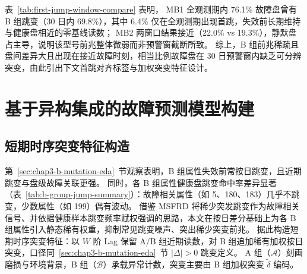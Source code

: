 表~\ref{tab:first-jump-window-compare} 表明，
MB1 全观测期内 76.1\% 故障盘曾有 B 组跳变（30 日内 69.8\%），其中 6.4\% 仅在全观测期出现首跳，失效前长期维持与健康盘相近的零基线读数；
MB2 两窗口结果接近（22.0\% vs 19.3\%），静默盘占主导，说明该型号前兆整体微弱而非预警窗截断所致。
综上，B 组前兆稀疏且盘间差异大且出现在接近故障时刻，相当比例故障盘在 30 日预警窗内缺乏可分辨突变，由此引出下文首跳对齐标签与加权突变特征设计。

\clearpage
\section{基于异构集成的故障预测模型构建}

\subsection{短期时序突变特征构造}
\label{sec:chap3-mutation-features}

第~\ref{sec:chap3-b-mutation-eda}~节观察表明，B 组属性失效前常按日跳变，且近期跳变与盘级故障关联更强。
同时，各 B 组属性健康盘跳变命中率差异显著（表~\ref{tab:b-group-jump-summary}）：故障相关属性（如 5、180、183）几乎不跳变，少数属性（如 199）偶有波动。
借鉴 MSFRD\cite{zhang2024msfrd} 将稀少突发跳变作为故障相关信号、并依据健康样本跳变频率赋权强调的思路，本文在按日差分基础上为各 B 组属性引入静态稀有权重，抑制常见跳变噪声、突出稀少突变前兆。
据此构造短期时序突变特征：以 $W$ 阶 Lag 保留 A/B 组近期读数，对 B 组追加稀有加权按日突变，口径同~\ref{sec:chap3-b-mutation-eda}~节 $|\Delta|>0$ 跳变定义。
A 组（$\mathcal{A}$）刻画磨损与环境背景，B 组（$\mathcal{B}$）承载异常计数，突变主要由 B 组加权突变 $\tilde{\delta}$ 编码。

